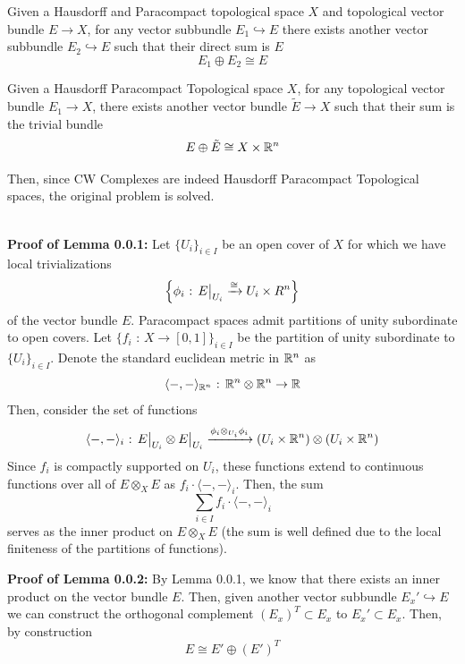 \documentclass[11pt]{article}
\begin{document}
\begin{redbox}
  \begin{lemma}
    Given a Hausdorff and Paracompact topological space $X$ and topological vector bundle $E \rightarrow X$, for any vector subbundle $E_1 \hookrightarrow E$ there exists another vector subbundle $E_2 \hookrightarrow E$ such that their direct sum is $E$ $$E_1 \oplus E_2 \cong E$$
  \end{lemma}
\end{redbox}

\begin{redbox}
  \begin{lemma}
    Given a Hausdorff Paracompact Topological space $X$, for any topological vector bundle $E_1 \rightarrow X$, there exists another vector bundle $\tilde{E} \rightarrow X$ such that their sum is the trivial bundle $$ E \oplus \tilde{E} \cong X \times \mathbb{R}^n $$
  \end{lemma}
\end{redbox} Then, since CW Complexes are indeed Hausdorff Paracompact Topological spaces, the original problem is solved.
\\
\\
\begin{dottedbox}
  \textbf{Proof of Lemma 0.0.1:} Let $\{U_i\}_{i \in I}$ be an open cover of $X$ for which we have local trivializations $$\left\{ \phi_{i} \text{ : } \restr{E}{U_{i}} \xrightarrow{\cong} U_i \times R^n \right\}$$ of the vector bundle $E$. Paracompact spaces admit partitions of unity subordinate to open covers. Let $\{f_i \text{ : } X \rightarrow [0, 1] \}_{i \in I}$ be the partition of unity subordinate to $\{U_i\}_{i \in I}$. Denote the standard euclidean metric in $\mathbb{R}^n$ as 
  $$ \langle -,-\rangle_{\mathbb{R}^{n}} \text{ : } \mathbb{R}^n \otimes \mathbb{R}^n \rightarrow \mathbb{R} $$ Then, consider the set of functions 
  $$ \langle -,- \rangle_{i} \text{ : } \restr{E}{U_{i}} \otimes \restr{E}{U_{i}} \xrightarrow{\phi_i \otimes_{U_{i}} \phi_i} (U_i \times \R^n) \otimes (U_i \times \R^n) $$
  Since $f_i$ is compactly supported on $U_i$, these functions extend to continuous functions over all of $E \otimes_{X} E$ as $f_i\cdot \langle -,-\rangle_{i}$. Then, the sum 
  $$ \sum_{i \in I} f_i \cdot \langle -,- \rangle_{i} $$ serves as the inner product on $E \otimes_X E$ (the sum is well defined due to the local finiteness of the partitions of functions).
\end{dottedbox}



\begin{dottedbox}
  \textbf{Proof of Lemma 0.0.2:} By Lemma 0.0.1, we know that there exists an inner product on the vector bundle $E$. Then, given another vector subbundle $E_x' \hookrightarrow E$ we can construct the orthogonal complement $(E_x)^T \subset E_x$ to $E_x' \subset E_x$. Then, by construction 
  $$ E \cong E' \oplus (E')^T $$ 
\end{dottedbox}
\end{document}
